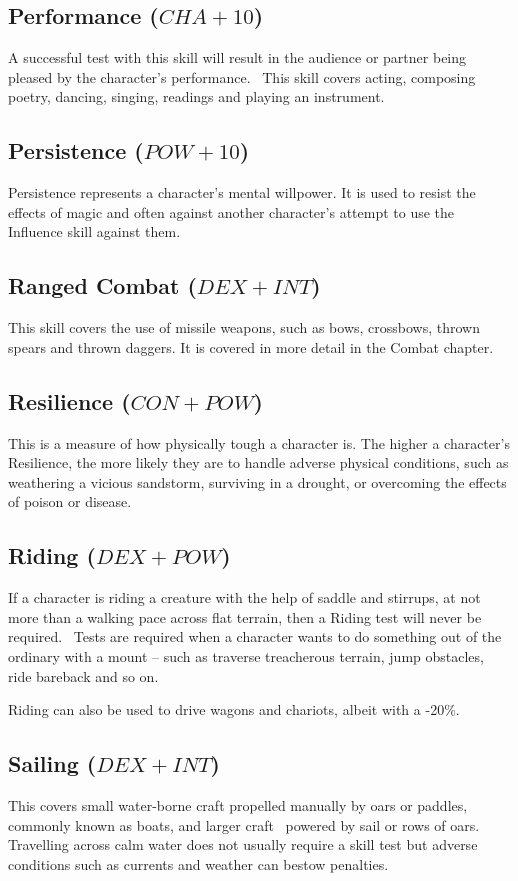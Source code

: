 \subsection{Performance ($CHA+10$)}
A successful test with this skill will result in the audience or partner being pleased by the character’s performance.  This skill covers acting, composing poetry, dancing, singing, readings and playing an instrument. 

\subsection{Persistence ($POW+10$)}
Persistence represents a character’s mental willpower. It is used to resist the effects of magic and often against another character’s attempt to use the Influence skill against them.  

\subsection{Ranged Combat ($DEX+INT$)}
This skill covers the use of missile weapons, such as bows, crossbows, thrown spears and thrown daggers. It is covered in more detail in the Combat chapter.

\subsection{Resilience ($CON+POW$)}
This is a measure of how physically tough a character is. The higher a character’s Resilience, the more likely they are to handle adverse physical conditions, such as weathering a vicious sandstorm, surviving in a drought, or overcoming the effects of poison or disease. 


\subsection{Riding ($DEX+POW$)}
If a character is riding a creature with the help of saddle and stirrups, at not more than a walking pace across flat terrain, then a Riding test will never be required.  Tests are required when a character wants to do something out of the ordinary with a mount – such as traverse treacherous terrain, jump obstacles, ride bareback and so on. 

Riding can also be used to drive wagons and chariots, albeit with a -20\%.


\subsection{Sailing ($DEX+INT$)}
This covers small water-borne craft propelled manually by oars or paddles, commonly known as boats, and larger craft  powered by sail or rows of oars. Travelling across calm water does not usually require a skill test but adverse conditions such as currents and weather can bestow penalties. 

